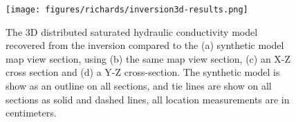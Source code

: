 \begin{figure}[!htbp]
\begin{center}
\texttt{[image: figures/richards/inversion3d-results.png]}
\end{center}
\caption{The 3D distributed saturated hydraulic conductivity model recovered from the inversion compared to the (a) synthetic model map view section, using (b) the same map view section, (c) an X-Z cross section and (d) a Y-Z cross-section. The synthetic model is show as an outline on all sections, and tie lines are show on all sections as solid and dashed lines, all location measurements are in centimeters.}
\label{fig:richards-inversion3d-results}
\end{figure}
